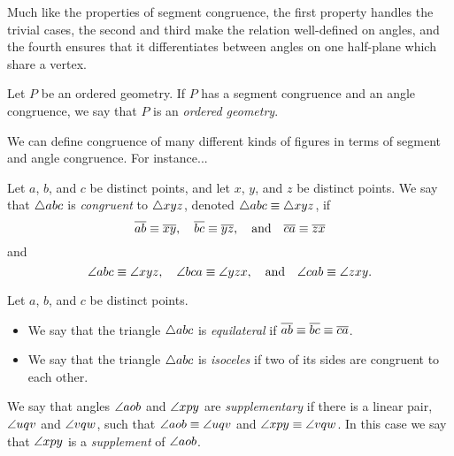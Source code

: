Much like the properties of segment congruence, the first property handles the trivial cases, the second and third make the relation well-defined on angles, and the fourth ensures that it differentiates between angles on one half-plane which share a vertex.

\begin{dfn}
Let $P$ be an ordered geometry. If $P$ has a segment congruence and an angle congruence, we say that $P$ is an \emph{ordered geometry}.
\end{dfn}

We can define congruence of many different kinds of figures in terms of segment and angle congruence. For instance...

\begin{dfn}
Let $a$, $b$, and $c$ be distinct points, and let $x$, $y$, and $z$ be distinct points. We say that $\bigtriangleup{abc}$ is \emph{congruent} to $\bigtriangleup{xyz}$, denoted $\bigtriangleup{abc} \equiv \bigtriangleup{xyz}$, if \[ \overline{ab} \equiv \overline{xy}, \quad \overline{bc} \equiv \overline{yz}, \quad \mathrm{and} \quad \overline{ca} \equiv \overline{zx} \] and \[ \angle{abc} \equiv \angle{xyz}, \quad \angle{bca} \equiv \angle{yzx}, \quad \mathrm{and} \quad \angle{cab} \equiv \angle{zxy}. \]
\end{dfn}

\begin{dfn}
Let $a$, $b$, and $c$ be distinct points.
\begin{itemize}
\item We say that the triangle $\bigtriangleup{abc}$ is \emph{equilateral} if $\overline{ab} \equiv \overline{bc} \equiv \overline{ca}$.
\item We say that the triangle $\bigtriangleup{abc}$ is \emph{isoceles} if two of its sides are congruent to each other.
\end{itemize}
\end{dfn}


\begin{dfn}
We say that angles $\angle{aob}$ and $\angle{xpy}$ are \emph{supplementary} if there is a linear pair, $\angle{uqv}$ and $\angle{vqw}$, such that $\angle{aob} \equiv \angle{uqv}$ and $\angle{xpy} \equiv \angle{vqw}$. In this case we say that $\angle{xpy}$ is a \emph{supplement} of $\angle{aob}$.
\end{dfn}

